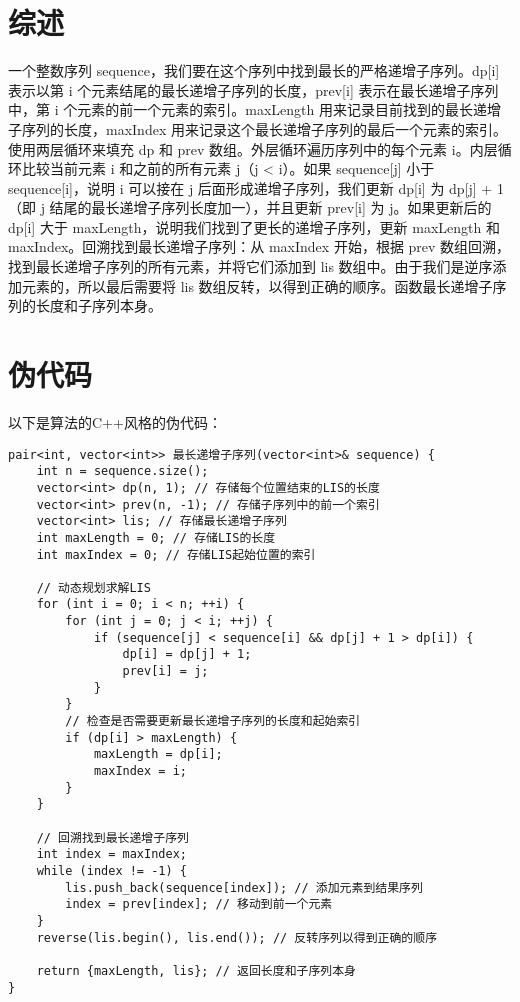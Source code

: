 \documentclass{article}
\begin{document}
\pagestyle{fancy}
\fancyhead{}

\section{综述}

一个整数序列 sequence，我们要在这个序列中找到最长的严格递增子序列。dp[i] 表示以第 i 个元素结尾的最长递增子序列的长度，prev[i] 表示在最长递增子序列中，第 i 个元素的前一个元素的索引。maxLength 用来记录目前找到的最长递增子序列的长度，maxIndex 用来记录这个最长递增子序列的最后一个元素的索引。使用两层循环来填充 dp 和 prev 数组。外层循环遍历序列中的每个元素 i。内层循环比较当前元素 i 和之前的所有元素 j（j < i）。如果 sequence[j] 小于 sequence[i]，说明 i 可以接在 j 后面形成递增子序列，我们更新 dp[i] 为 dp[j] + 1（即 j 结尾的最长递增子序列长度加一），并且更新 prev[i] 为 j。如果更新后的 dp[i] 大于 maxLength，说明我们找到了更长的递增子序列，更新 maxLength 和 maxIndex。回溯找到最长递增子序列：从 maxIndex 开始，根据 prev 数组回溯，找到最长递增子序列的所有元素，并将它们添加到 lis 数组中。由于我们是逆序添加元素的，所以最后需要将 lis 数组反转，以得到正确的顺序。函数最长递增子序列的长度和子序列本身。

\section{伪代码}
以下是算法的C++风格的伪代码：

\begin{verbatim}
pair<int, vector<int>> 最长递增子序列(vector<int>& sequence) {
    int n = sequence.size();
    vector<int> dp(n, 1); // 存储每个位置结束的LIS的长度
    vector<int> prev(n, -1); // 存储子序列中的前一个索引
    vector<int> lis; // 存储最长递增子序列
    int maxLength = 0; // 存储LIS的长度
    int maxIndex = 0; // 存储LIS起始位置的索引

    // 动态规划求解LIS
    for (int i = 0; i < n; ++i) {
        for (int j = 0; j < i; ++j) {
            if (sequence[j] < sequence[i] && dp[j] + 1 > dp[i]) {
                dp[i] = dp[j] + 1;
                prev[i] = j;
            }
        }
        // 检查是否需要更新最长递增子序列的长度和起始索引
        if (dp[i] > maxLength) {
            maxLength = dp[i];
            maxIndex = i;
        }
    }

    // 回溯找到最长递增子序列
    int index = maxIndex;
    while (index != -1) {
        lis.push_back(sequence[index]); // 添加元素到结果序列
        index = prev[index]; // 移动到前一个元素
    }
    reverse(lis.begin(), lis.end()); // 反转序列以得到正确的顺序

    return {maxLength, lis}; // 返回长度和子序列本身
}
\end{verbatim}
\end{document}
